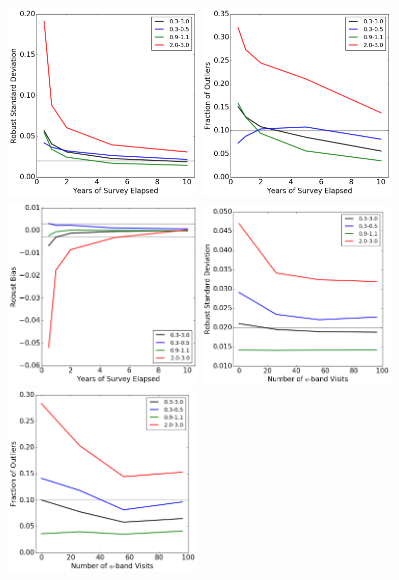 \begin{figure}[h]
\begin{center}
\includegraphics[width=5cm]{figs/photoz/pstat_nyears_IQRs.png}
\includegraphics[width=5cm]{figs/photoz/pstat_nyears_fout.png}
\includegraphics[width=5cm]{figs/photoz/pstat_nyears_bias.png}
\includegraphics[width=5cm]{figs/photoz/pstat_uvisits_IQRs.png}
\includegraphics[width=5cm]{figs/photoz/pstat_uvisits_fout.png}

\end{center}
\end{figure}
